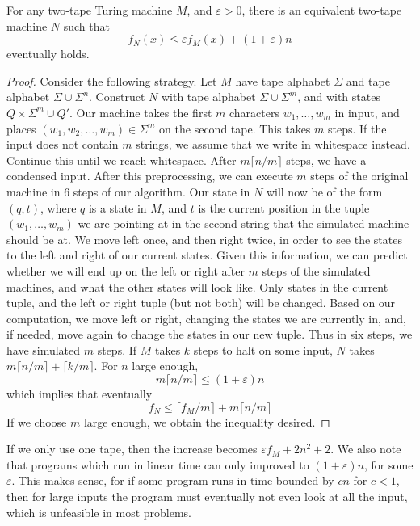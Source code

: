 \begin{theorem}
    For any two-tape Turing machine $M$, and $\varepsilon > 0$, there is an equivalent two-tape machine $N$ such that
    \[ f_N(x) \leq \varepsilon f_M(x) + (1 + \varepsilon) n \]
    eventually holds.
\end{theorem}
\begin{proof}
    Consider the following strategy. Let $M$ have tape alphabet $\Sigma$ and tape alphabet $\Sigma \cup \Sigma^n$. Construct $N$ with tape alphabet $\Sigma \cup \Sigma^m$, and with states $Q \times \Sigma^m \cup Q'$. Our machine takes the first $m$ characters $w_1, \dots, w_m$ in input, and places $(w_1, w_2, \dots, w_m) \in \Sigma^m$ on the second tape. This takes $m$ steps. If the input does not contain $m$ strings, we assume that we write in whitespace instead. Continue this until we reach whitespace. After $m \lceil n/m \rceil$ steps, we have a condensed input. After this preprocessing, we can execute $m$ steps of the original machine in 6 steps of our algorithm. Our state in $N$ will now be of the form $(q,t)$, where $q$ is a state in $M$, and $t$ is the current position in the tuple $(w_1, \dots, w_m)$ we are pointing at in the second string that the simulated machine should be at. We move left once, and then right twice, in order to see the states to the left and right of our current states. Given this information, we can predict whether we will end up on the left or right after $m$ steps of the simulated machines, and what the other states will look like. Only states in the current tuple, and the left or right tuple (but not both) will be changed. Based on our computation, we move left or right, changing the states we are currently in, and, if needed, move again to change the states in our new tuple. Thus in six steps, we have simulated $m$ steps. If $M$ takes $k$ steps to halt on some input, $N$ takes $m \lceil n/m \rceil + \lceil k/m \rceil$. For $n$ large enough,
    \[ m \lceil n/m \rceil \leq (1 + \varepsilon) n \]
    which implies that eventually
    \[ f_N \leq \lceil f_M/m \rceil + m \lceil n/m \rceil \]
    If we choose $m$ large enough, we obtain the inequality desired.
\end{proof}

If we only use one tape, then the increase becomes $\varepsilon f_M + 2 n^2 + 2$. We also note that programs which run in linear time can only improved to $(1 + \varepsilon) n$, for some $\varepsilon$. This makes sense, for if some program runs in time bounded by $cn$ for $c < 1$, then for large inputs the program must eventually not even look at all the input, which is unfeasible in most problems.

